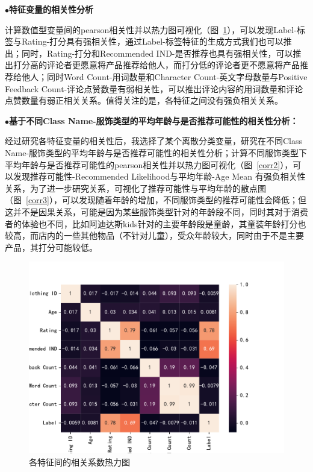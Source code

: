 \documentclass[
  journal=medium,
  manuscript=article-type,
  year=2023,
  volume=37,
]{cup-journal}
\begin{document}
$\bullet$\textbf{特征变量的相关性分析}

计算数值型变量间的pearson相关性并以热力图可视化（图~\ref{corr}），可以发现Label-标签与Rating-打分具有强相关性，通过Label-标签特征的生成方式我们也可以推出；同时，Rating-打分和Recommended IND-是否推荐也具有强相关性，可以推出打分高的评论者更愿意将产品推荐给他人，而打分低的评论者更不愿意将产品推荐给他人；同时Word Count-用词数量和Character Count-英文字母数量与Positive Feedback Count-评论点赞数量有弱相关性，可以推出评论内容的用词数量和评论点赞数量有弱正相关关系。值得关注的是，各特征之间没有强负相关关系。

$\bullet$\textbf{基于不同Class Name-服饰类型的平均年龄与是否推荐可能性的相关性分析：}

经过研究各特征变量的相关性后，我选择了某个离散分类变量，研究在不同Class Name-服饰类型的平均年龄与是否推荐可能性的相关性分析；计算不同服饰类型下平均年龄与是否推荐可能性的pearson相关性并以热力图可视化（图~\ref{corr2}），可以发现推荐可能性-Recommended Likelihood与平均年龄-Age Mean 有强负相关性关系，为了进一步研究关系，可视化了推荐可能性与平均年龄的散点图（图~\ref{corr3}），可以发现随着年龄的增加，不同服饰类型的推荐可能性会降低；但这并不是因果关系，可能是因为某些服饰类型针对的年龄段不同，同时其对于消费者的体验也不同，比如阿迪达斯kids针对的主要年龄段是童龄，其童装年龄打分也较高，而店内的一些其他物品（不针对儿童），受众年龄较大，同时由于不是主要产品，其打分可能较低。

\begin{figure}[hbt!]
    \centering
    \includegraphics[width=0.8\linewidth]{corr.pdf}
    \caption{各特征间的相关系数热力图}
    \label{corr}
\end{figure}
\end{document}
